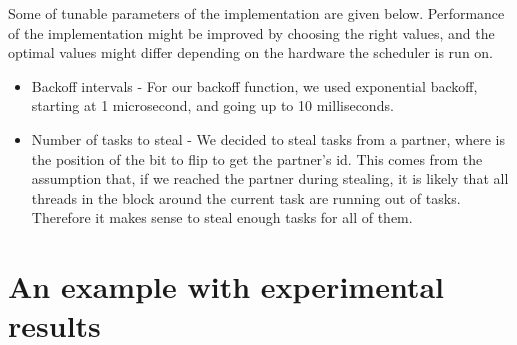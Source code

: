 \documentclass[preprint]{sigplanconf}
\begin{document}
Some of tunable parameters of the implementation are given
below. Performance of the implementation might be improved by choosing
the right values, and the optimal values might differ depending on the
hardware the scheduler is run on.

\begin{itemize}
\item Backoff intervals - For our backoff function, we used
exponential backoff, starting at 1 microsecond, and going up to 10
milliseconds.
\item Number of tasks to steal - We decided to steal  tasks
from a partner, where  is the position of the bit to flip to get
the partner's id. This comes from the assumption that, if we reached
the  partner during stealing, it is likely that all threads
in the  block around the current task are running out of
tasks. Therefore it makes sense to steal enough tasks for all of them.
\end{itemize}

\section{An example with experimental results}
\label{sec:quicksort}
\end{document}
